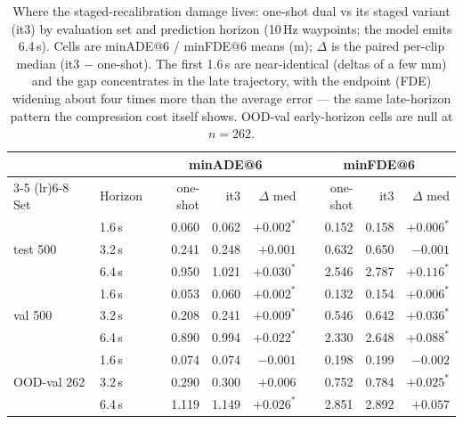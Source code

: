 \begin{table}[t]
\centering
\small
\setlength{\tabcolsep}{4pt}
\caption{%
  Where the staged-recalibration damage lives: one-shot dual vs its staged variant
  (it3) by evaluation set and prediction horizon (10\,Hz waypoints; the model emits
  6.4\,s). Cells are minADE@6 / minFDE@6 means (m); $\Delta$ is the paired per-clip
  median (it3 $-$ one-shot). The first 1.6\,s are near-identical (deltas of a few mm)
  and the gap concentrates in the late trajectory, with the endpoint (FDE) widening
  about four times more than the average error --- the same late-horizon pattern the
  compression cost itself shows. OOD-val early-horizon cells are null at $n{=}262$.
}
\label{tab:horizons}
\begin{tabular}{llrrrrrr}
\toprule
& & \multicolumn{3}{c}{minADE@6} & \multicolumn{3}{c}{minFDE@6} \\
\cmidrule(lr){3-5} \cmidrule(lr){6-8}
Set & Horizon & one-shot & it3 & $\Delta$ med & one-shot & it3 & $\Delta$ med \\
\midrule
\multirow{3}{*}{test 500}
  & 1.6\,s & 0.060 & 0.062 & $+0.002^*$ & 0.152 & 0.158 & $+0.006^*$ \\
  & 3.2\,s & 0.241 & 0.248 & $+0.001$   & 0.632 & 0.650 & $-0.001$   \\
  & 6.4\,s & 0.950 & 1.021 & $+0.030^*$ & 2.546 & 2.787 & $+0.116^*$ \\
\midrule
\multirow{3}{*}{val 500}
  & 1.6\,s & 0.053 & 0.060 & $+0.002^*$ & 0.132 & 0.154 & $+0.006^*$ \\
  & 3.2\,s & 0.208 & 0.241 & $+0.009^*$ & 0.546 & 0.642 & $+0.036^*$ \\
  & 6.4\,s & 0.890 & 0.994 & $+0.022^*$ & 2.330 & 2.648 & $+0.088^*$ \\
\midrule
\multirow{3}{*}{OOD-val 262}
  & 1.6\,s & 0.074 & 0.074 & $-0.001$   & 0.198 & 0.199 & $-0.002$   \\
  & 3.2\,s & 0.290 & 0.300 & $+0.006$   & 0.752 & 0.784 & $+0.025^*$ \\
  & 6.4\,s & 1.119 & 1.149 & $+0.026^*$ & 2.851 & 2.892 & $+0.057$   \\
\bottomrule
\end{tabular}
\end{table}
